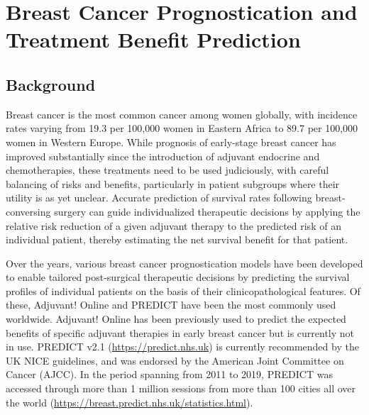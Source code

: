 \documentclass [PhD] {uclathes}
\begin{document}
\chapter{Breast Cancer Prognostication and \\Treatment Benefit Prediction}

\section{Background}
\label{ch8sec0}
Breast cancer is the most common cancer among women globally, with incidence rates varying from 19.3 per 100,000 women in Eastern Africa to 89.7 per 100,000 women in Western Europe.\cite{fitzmaurice2017global,bray2018global} While prognosis of early-stage breast cancer has improved substantially since the introduction of adjuvant endocrine and chemotherapies,\cite{guo2018trends} these treatments need to be used judiciously, with careful balancing of risks and benefits, particularly in patient subgroups where their utility is as yet unclear. Accurate prediction of survival rates following breast-conversing surgery can guide individualized therapeutic decisions by applying the relative risk reduction of a given adjuvant therapy to the predicted risk of an individual patient, thereby estimating the net survival benefit for that patient.\cite{sparano2019clinical,symmans2007measurement}

Over the years, various breast cancer prognostication models have been developed to enable tailored post-surgical therapeutic decisions by predicting the survival profiles of individual patients on the basis of their clinicopathological features. Of these, Adjuvant! Online\cite{ravdin2001computer} and PREDICT\cite{wishart2010predict,dos2017updated} have been the most commonly used worldwide.\cite{shachar2016internet} Adjuvant! Online has been previously used to predict the expected benefits of specific adjuvant therapies in early breast cancer but is currently not in use. PREDICT v2.1\cite{dos2017updated} (\href{https://predict.nhs.uk}{https://predict.nhs.uk}) is currently recommended by the UK NICE guidelines, and was endorsed by the American Joint Committee on Cancer (AJCC).\cite{kattan2016american} In the period spanning from 2011 to 2019, PREDICT was accessed through more than 1 million sessions from more than 100 cities all over the world (\href{https://breast.predict.nhs.uk/statistics.html}{https://breast.predict.nhs.uk/statistics.html}). 
\end{document}
